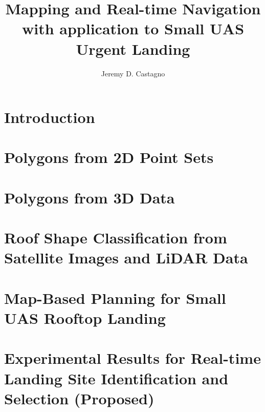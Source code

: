 \documentclass[thesis]{./style/thesis-umich}
\title{Mapping and Real-time Navigation \\ with application to Small UAS Urgent Landing}
\author{Jeremy D. Castagno}
\begin{document}

\chapter{Introduction}
 \label{ch:introduction}
 

 
\chapter{Polygons from 2D Point Sets}
 \label{ch:polylidar}
 
 
 
\chapter{Polygons from 3D Data}
 \label{ch:polylidar3d}
 
 
 
\chapter{Roof Shape Classification from Satellite Images and LiDAR Data  }
 \label{ch:roofshape}
 
 
\chapter{Map-Based Planning for Small UAS Rooftop Landing }
 \label{ch:maplanding}
 
 
\chapter{Experimental Results for Real-time Landing Site Identification and Selection (Proposed)}
 \label{ch:experiments}
 


%  








\end{document}
